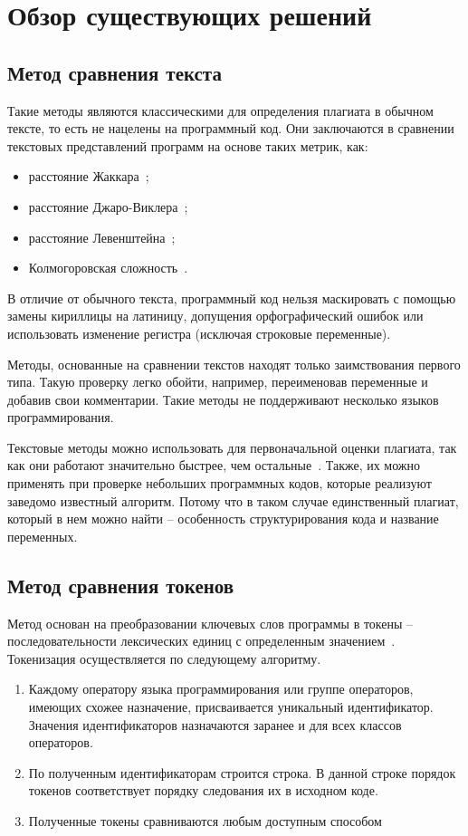 \section{Обзор существующих решений}

\subsection{Метод сравнения текста}
Такие методы являются классическими для определения плагиата в обычном тексте, то есть не нацелены на программный код. Они заключаются в сравнении текстовых представлений программ на основе таких метрик, как:
\begin{itemize}[label*=---]
	\item расстояние Жаккара~\cite{Jaccard};
	\item расстояние Джаро-Виклера~\cite{Jaro};
	\item расстояние Левенштейна~\cite{Lev};
	\item Колмогоровская сложность~\cite{Kolm}.
\end{itemize}

В отличие от обычного текста, программный код нельзя маскировать с помощью замены кириллицы на латиницу, допущения орфографический ошибок или использовать изменение регистра (исключая строковые переменные).

Методы, основанные на сравнении текстов находят только заимствования первого типа. Такую проверку легко обойти, например, переименовав переменные и добавив свои комментарии. Такие методы не поддерживают несколько языков программирования. 

Текстовые методы можно использовать для первоначальной оценки плагиата, так как они работают значительно быстрее, чем остальные~\cite{text}. Также, их можно применять при проверке небольших программных кодов, которые реализуют заведомо известный алгоритм. Потому что в таком случае единственный плагиат, который в нем можно найти -- особенность структурирования кода и название переменных. 

\subsection{Метод сравнения токенов}
Метод основан на преобразовании ключевых слов программы в токены -- последовательности лексических единиц с определенным значением~\cite{token}. 
\pagebreak
Токенизация осуществляется по следующему алгоритму.
\begin{enumerate}
	\item Каждому оператору языка программирования или группе операторов, имеющих схожее назначение, присваивается уникальный идентификатор. Значения идентификаторов назначаются заранее и для
	всех классов операторов.
	\item По полученным идентификаторам строится строка. В данной строке порядок токенов соответствует порядку следования их в исходном коде.
	\item Полученные токены сравниваются любым доступным способом
\end{enumerate}

